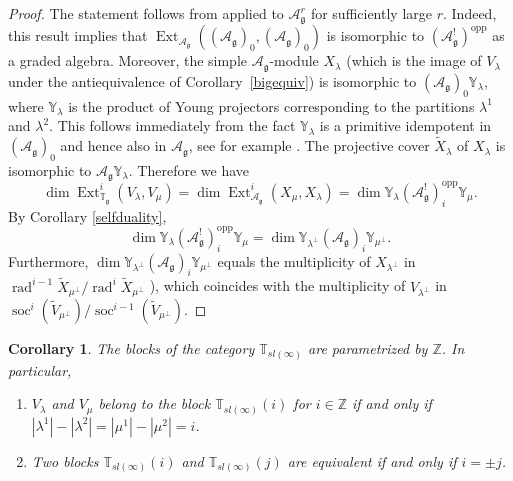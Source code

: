 \documentclass{amsart}
\renewcommand{\sl}{sl}
\newcommand{\T}{\mathbb T}
\newcommand{\Tg}{\mathbb T_{\mathfrak g}}
\renewcommand{\gg}{\mathfrak{g}}
\newcommand{\ZZ}{\mathbb{Z}}
\newtheorem{cor}[thm]{Corollary}
\theoremstyle{definition}
\numberwithin{equation}{section}
\begin{document}
\begin{proof} The statement follows from \cite[Theorem 2.10.1]{BGS} applied to
  $\mathcal A^r_\gg$ for sufficiently large $r$. Indeed, this result implies that 
$\operatorname{Ext}_{\mathcal A_\gg}((\mathcal A_\gg)_0,(\mathcal A_\gg)_0)$ is
isomorphic to  $(\mathcal A_\gg^!)^\mathrm{opp}$ as a graded algebra. 
Moreover, the simple $\mathcal A_\gg$-module $X_\lambda$ (which is the image of $V_\lambda$ under the antiequivalence of Corollary~\ref{bigequiv}) is isomorphic to $(\mathcal A_\gg)_0\mathbb Y_\lambda $, where 
$\mathbb Y_\lambda$ is the product of Young projectors  corresponding
to the partitions $\lambda^1$ and $\lambda^2$. This follows immediately
from the fact $\mathbb Y_\lambda$ is a primitive idempotent in
$(\mathcal A_\gg)_0$ and hence also in $\mathcal A_\gg$, see for example \cite[Theorem 54.5]{CR}. 
The projective cover $\tilde{X}_\lambda$ of $X_\lambda$ is isomorphic to $\mathcal A_\gg\mathbb Y_\lambda$. Therefore we have
$$\operatorname{dim}\operatorname{Ext}^i_{\Tg}(V_\lambda,V_\mu)=
\operatorname{dim}\operatorname{Ext}^i_{\mathcal
  A_\gg}(X_\mu,X_\lambda)=
\operatorname{dim}\mathbb Y_\lambda (\mathcal A_\gg^!)^\mathrm{opp}_i \mathbb Y_\mu.$$
 By Corollary \ref{selfduality},
$$\operatorname{dim}\mathbb Y_\lambda 
(\mathcal A_\gg^!)^\mathrm{opp}_i \mathbb Y_\mu=
\operatorname{dim}\mathbb Y_{\lambda^\perp} (\mathcal A_\gg)_i \mathbb
Y_{\mu^\perp}.$$
Furthermore, 
$\operatorname{dim}\mathbb Y_{\lambda^\perp} (\mathcal A_\gg)_i \mathbb
Y_{\mu^\perp}$ equals the multiplicity of $X_{\lambda^\perp}$ in 
$\operatorname{rad}^{i-1}\tilde{X}_{\mu^\perp} / \operatorname{rad}^i\tilde{X}_{\mu^\perp}$  \cite[Theorem 54.15]{CR}), which coincides with the multiplicity of $V_{\lambda^\perp}$ in $\operatorname{soc}^i(\tilde{V}_{\mu^\perp})/\operatorname{soc}^{i-1}(\tilde{V}_{\mu^\perp})$.
\end{proof}


\begin{cor}
The blocks of the category $\T_{\sl(\infty)}$ are parametrized by $\ZZ$.  In particular, 
\begin{enumerate}
\item $V_\lambda$ and $V_\mu$ belong to the block $\T_{\sl(\infty)} (i)$ for $i \in \ZZ$ if and only if $|\lambda^1| - |\lambda^2| = |\mu^1| - | \mu^2| = i$.
\item Two blocks $\T_{\sl(\infty)} (i)$ and $\T_{\sl(\infty)} (j)$ are equivalent if and only if $i = \pm j$. 
\end{enumerate}
\end{cor}
\end{document}
